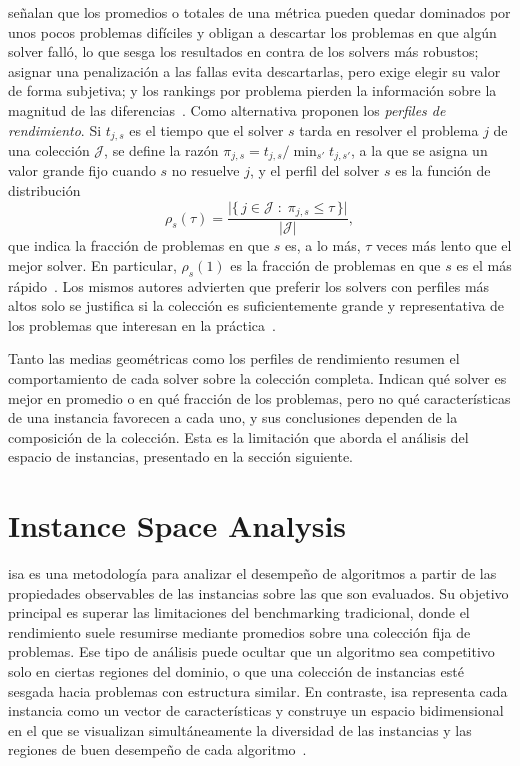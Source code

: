\textcite{dolanBenchmarkingOptimizationSoftware2002} señalan que los promedios o totales de una
métrica pueden quedar dominados por unos pocos problemas difíciles y obligan a descartar los
problemas en que algún solver falló, lo que sesga los resultados en contra de los solvers más
robustos; asignar una penalización a las fallas evita descartarlas, pero exige elegir su valor de
forma subjetiva; y los rankings por problema pierden la información sobre la magnitud de las
diferencias~\parencite[sec.~1]{dolanBenchmarkingOptimizationSoftware2002}. Como alternativa
proponen los \textit{perfiles de rendimiento}. Si $t_{j,s}$ es el tiempo que el solver $s$ tarda
en resolver el problema $j$ de una colección $\mathcal{J}$, se define la razón
$\pi_{j,s} = t_{j,s} / \min_{s'} t_{j,s'}$, a la que se asigna un valor grande fijo cuando $s$ no
resuelve $j$, y el perfil del solver $s$ es la función de distribución
\[
    \rho_s(\tau) = \frac{\bigl|\{\, j \in \mathcal{J} \;:\; \pi_{j,s} \leq \tau \,\}\bigr|}
    {|\mathcal{J}|},
\]
que indica la fracción de problemas en que $s$ es, a lo más, $\tau$ veces más lento que el
mejor solver. En particular, $\rho_s(1)$ es la fracción de problemas en que $s$ es el más
rápido~\parencite[sec.~2]{dolanBenchmarkingOptimizationSoftware2002}. Los mismos autores advierten
que preferir los solvers con perfiles más altos solo se justifica si la colección es
suficientemente grande y representativa de los problemas que interesan en la
práctica~\parencite[sec.~2]{dolanBenchmarkingOptimizationSoftware2002}.

Tanto las medias geométricas como los perfiles de rendimiento resumen el comportamiento de cada
solver sobre la colección completa. Indican qué solver es mejor en promedio o en qué fracción de
los problemas, pero no qué características de una instancia favorecen a cada uno, y sus
conclusiones dependen de la composición de la colección. Esta es la limitación que aborda el
análisis del espacio de instancias, presentado en la sección siguiente.


\newpage
\section{Instance Space Analysis}
\label{sec:instance_space_analysis}

\acrfull{isa} es una metodología para analizar el desempeño de algoritmos a partir de las
propiedades observables de las instancias sobre las que son evaluados. Su objetivo principal es
superar las limitaciones del benchmarking tradicional, donde el rendimiento suele resumirse
mediante promedios sobre una colección fija de problemas. Ese tipo de análisis puede ocultar
que un algoritmo sea competitivo solo en ciertas regiones del dominio, o que una colección de
instancias esté sesgada hacia problemas con estructura similar. En contraste, \acrshort{isa}
representa cada instancia como un vector de características y construye un espacio bidimensional
en el que se visualizan simultáneamente la diversidad de las instancias y las regiones de buen
desempeño de cada algoritmo~\parencite{smith-milesInstanceSpaceAnalysis2023a}.


